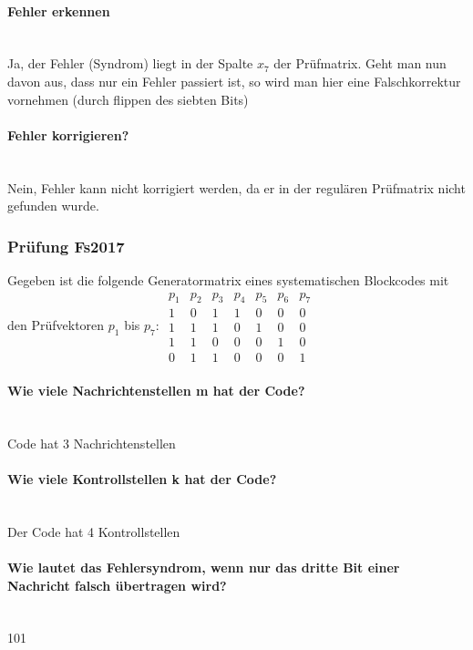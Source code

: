 \paragraph{Fehler erkennen}\mbox{}\\
Ja, der Fehler (Syndrom) liegt in der Spalte $x_7$ der Prüfmatrix.
Geht man nun davon aus, dass nur ein Fehler passiert ist, so wird man hier eine Falschkorrektur vornehmen
(durch flippen des siebten Bits)

\paragraph{Fehler korrigieren?}\mbox{}\\
Nein, Fehler kann nicht korrigiert werden, da er in der regulären Prüfmatrix nicht gefunden wurde.

\subsubsection{Prüfung Fs2017}
Gegeben ist die folgende Generatormatrix eines systematischen Blockcodes mit den Prüfvektoren $p_1$ bis $p_7$:
$\begin{matrix}
    p_1 & p_2 & p_3 & p_4 & p_5 & p_6 & p_7\\
    1 & 0 & 1 & 1 & 0 & 0 & 0\\
    1 & 1 & 1 & 0 & 1 & 0 & 0\\
    1 & 1 & 0 & 0 & 0 & 1 & 0\\
    0 & 1 & 1 & 0 & 0 & 0 & 1
\end{matrix}$

\paragraph{Wie viele Nachrichtenstellen m hat der Code?}\mbox{}\\
Code hat 3 Nachrichtenstellen

\paragraph{Wie viele Kontrollstellen k hat der Code?}\mbox{}\\
Der Code hat 4 Kontrollstellen

\paragraph{Wie lautet das Fehlersyndrom, wenn nur das dritte Bit einer Nachricht falsch übertragen wird?}\mbox{}\\
101


